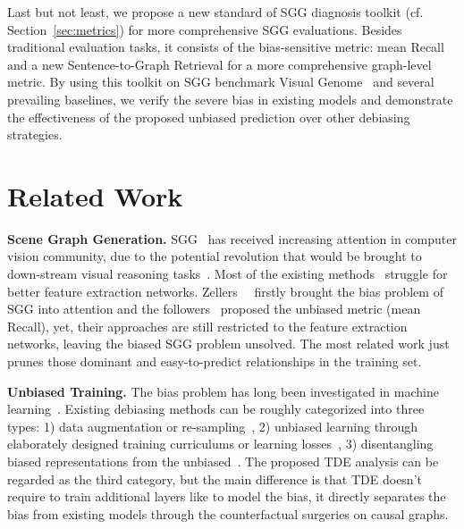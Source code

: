 \documentclass[10pt,twocolumn,letterpaper]{article}
\begin{document}
Last but not least, we propose a new standard of SGG diagnosis toolkit (cf. Section~\ref{sec:metrics}) for more comprehensive SGG evaluations. Besides traditional evaluation tasks, it consists of the bias-sensitive metric: mean Recall~\cite{tang2019learning, chen2019knowledge} and a new Sentence-to-Graph Retrieval for a more comprehensive graph-level metric. By using this toolkit on SGG benchmark Visual Genome~\cite{krishna2017visual} and several prevailing baselines, we verify the severe bias in existing models and demonstrate the effectiveness of the proposed unbiased prediction over other debiasing strategies.    








 
\section{Related Work}
\noindent\textbf{Scene Graph Generation.} SGG~\cite{xu2017scene, zellers2018neural} has received increasing attention in computer vision community, due to the potential revolution that would be brought to down-stream visual reasoning tasks~\cite{shi2019explainable, yang2019auto, krishna2018referring, johnson2018image}. Most of the existing methods~\cite{xu2017scene, woo2018linknet, dai2017detecting, li2017scene, yin2018zoom, tang2019learning, yang2018graph, gu2019scene, qi2019attentive, wang2019exploring} struggle for better feature extraction networks. Zellers~\etal~\cite{zellers2018neural} firstly brought the bias problem of SGG into attention and the followers~\cite{tang2019learning, chen2019knowledge} proposed the unbiased metric (mean Recall), yet, their approaches are still restricted to the feature extraction networks, leaving the biased SGG problem unsolved. The most related work \cite{liang2019vrr} just prunes those dominant and easy-to-predict relationships in the training set.
 


\noindent\textbf{Unbiased Training.} The bias problem has long been investigated in machine learning~\cite{torralba2011unbiased}. Existing debiasing methods can be roughly categorized into three types: 1) data augmentation or re-sampling~\cite{geirhos2018imagenettrained, li2018resound, li2019repair, he2009learning, burnaev2015influence}, 2) unbiased learning through elaborately designed training curriculums or learning losses~\cite{zemel2013learning, lin2017focal}, 3) disentangling biased representations from the unbiased~\cite{misra2016seeing, cadene2019rubi}. The proposed TDE analysis can be regarded as the third category, but the main difference is that TDE doesn't require to train additional layers like \cite{misra2016seeing, cadene2019rubi} to model the bias, it directly separates the bias from existing models through the counterfactual surgeries on causal graphs.
\end{document}
